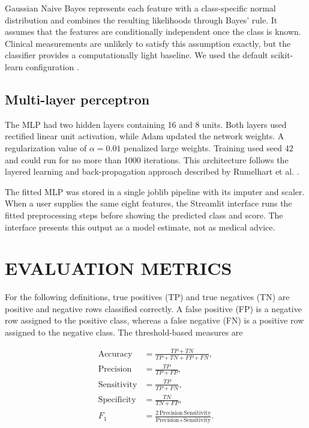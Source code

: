 \documentclass[pdflatex,sn-vancouver-num]{sn-jnl}
\begin{document}
Gaussian Naive Bayes represents each feature with a class-specific normal distribution and combines the resulting likelihoods through Bayes' rule. It assumes that the features are conditionally independent once the class is known. Clinical measurements are unlikely to satisfy this assumption exactly, but the classifier provides a computationally light baseline. We used the default scikit-learn configuration \cite{pedregosa2011scikit}.

\subsection{Multi-layer perceptron}\label{subsec:mlp}

The MLP had two hidden layers containing 16 and 8 units. Both layers used rectified linear unit activation, while Adam updated the network weights. A regularization value of $\alpha=0.01$ penalized large weights. Training used seed 42 and could run for no more than 1000 iterations. This architecture follows the layered learning and back-propagation approach described by Rumelhart et al. \cite{rumelhart1986backprop}.

The fitted MLP was stored in a single joblib pipeline with its imputer and scaler. When a user supplies the same eight features, the Streamlit interface runs the fitted preprocessing steps before showing the predicted class and score. The interface presents this output as a model estimate, not as medical advice.

\section{EVALUATION METRICS}\label{sec:metrics}

For the following definitions, true positives (TP) and true negatives (TN) are positive and negative rows classified correctly. A false positive (FP) is a negative row assigned to the positive class, whereas a false negative (FN) is a positive row assigned to the negative class. The threshold-based measures are

\begin{align}
\text{Accuracy} &= \frac{TP+TN}{TP+TN+FP+FN}, \label{eq:accuracy}\\
\text{Precision} &= \frac{TP}{TP+FP}, \label{eq:precision}\\
\text{Sensitivity} &= \frac{TP}{TP+FN}, \label{eq:sensitivity}\\
\text{Specificity} &= \frac{TN}{TN+FP}, \label{eq:specificity}\\
F_1 &= \frac{2\,\text{Precision}\,\text{Sensitivity}}
{\text{Precision}+\text{Sensitivity}}. \label{eq:f1}
\end{align}
\end{document}
